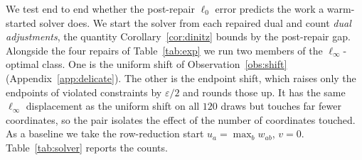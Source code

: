 We test end to end whether the post-repair $\ell_0$ error predicts the work a warm-started solver
does. We start the solver from each repaired dual and count \emph{dual adjustments}, the quantity Corollary~\ref{cor:dinitz} bounds by
the post-repair gap. Alongside the four repairs of
Table~\ref{tab:exp} we run two members of the $\ell_\infty$-optimal class. One is the uniform
shift of Observation~\ref{obs:shift} (Appendix~\ref{app:delicate}). The other is the endpoint
shift, which raises only the endpoints of violated constraints by $\varepsilon/2$ and rounds those
up. It has the same $\ell_\infty$ displacement as the uniform shift on all $120$ draws but touches
far fewer coordinates, so the pair isolates the effect of the number of coordinates
touched. As a baseline we take the row-reduction start
$u_a = \max_b w_{ab}$, $v = 0$. Table~\ref{tab:solver} reports the counts.

